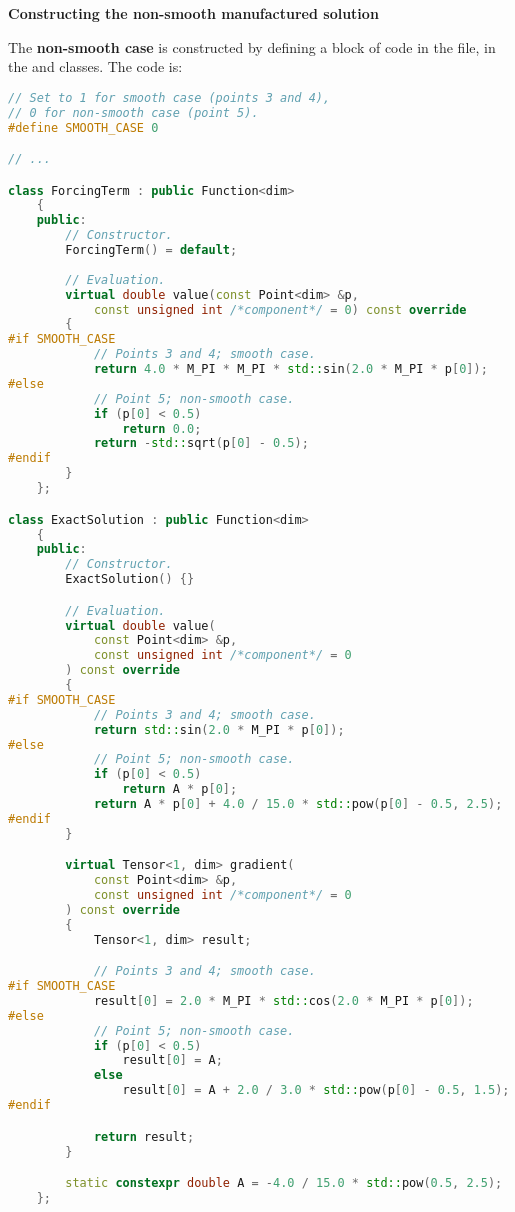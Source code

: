 \highspace
\begin{flushleft}
    \textcolor{Green3}{ \textbf{Constructing the non-smooth manufactured solution}}
\end{flushleft}
The \textbf{non-smooth case} is constructed by defining a block of code in the  file, in the  and  classes. The code is:
\begin{lstlisting}[language=C++]
// Set to 1 for smooth case (points 3 and 4),
// 0 for non-smooth case (point 5).
#define SMOOTH_CASE 0

// ...

class ForcingTerm : public Function<dim>
    {
    public:
        // Constructor.
        ForcingTerm() = default;
        
        // Evaluation.
        virtual double value(const Point<dim> &p,
            const unsigned int /*component*/ = 0) const override
        {
#if SMOOTH_CASE
            // Points 3 and 4; smooth case.
            return 4.0 * M_PI * M_PI * std::sin(2.0 * M_PI * p[0]);
#else
            // Point 5; non-smooth case.
            if (p[0] < 0.5)
                return 0.0;
            return -std::sqrt(p[0] - 0.5);
#endif
        }
    };

class ExactSolution : public Function<dim>
    {
    public:
        // Constructor.
        ExactSolution() {}

        // Evaluation.
        virtual double value(
            const Point<dim> &p,
            const unsigned int /*component*/ = 0
        ) const override
        {
#if SMOOTH_CASE
            // Points 3 and 4; smooth case.
            return std::sin(2.0 * M_PI * p[0]);
#else
            // Point 5; non-smooth case.
            if (p[0] < 0.5)
                return A * p[0];
            return A * p[0] + 4.0 / 15.0 * std::pow(p[0] - 0.5, 2.5);
#endif
        }

        virtual Tensor<1, dim> gradient(
            const Point<dim> &p,
            const unsigned int /*component*/ = 0
        ) const override
        {
            Tensor<1, dim> result;

            // Points 3 and 4; smooth case.
#if SMOOTH_CASE
            result[0] = 2.0 * M_PI * std::cos(2.0 * M_PI * p[0]);
#else
            // Point 5; non-smooth case.
            if (p[0] < 0.5)
                result[0] = A;
            else
                result[0] = A + 2.0 / 3.0 * std::pow(p[0] - 0.5, 1.5);
#endif

            return result;
        }

        static constexpr double A = -4.0 / 15.0 * std::pow(0.5, 2.5);
    };\end{lstlisting}
